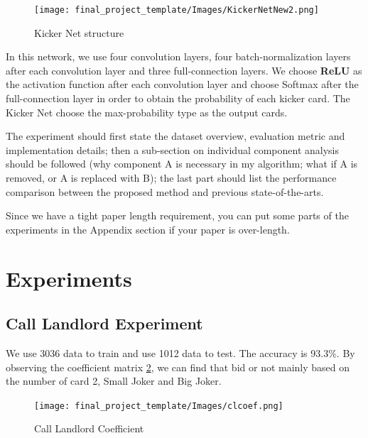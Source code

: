 \documentclass{article}
\begin{document}
\graphicspath{{Images/}}
\maketitle
\begin{figure}[htp]
    \caption{Kicker Net structure} \label{kicernetnew}
    \centering 
    \texttt{[image: final\_project\_template/Images/KickerNetNew2.png]}
\end{figure}

In this network, we use four convolution layers, four batch-normalization layers after each convolution layer and three full-connection layers. We choose \textbf{ReLU} as the activation function after each convolution layer and choose Softmax after the full-connection layer in order to obtain the probability of each kicker card. The Kicker Net choose the max-probability type as the output cards.



The experiment should first state the dataset overview, evaluation metric and implementation details; then a sub-section on individual component analysis should be followed (why component A is necessary in my algorithm; what if A is removed, or A is replaced with B); the last part should list the performance comparison between the proposed method and previous state-of-the-arts.

Since we have a tight paper length requirement, you can put some parts of the experiments in the Appendix section if your paper is over-length.

\section{Experiments}
\subsection{Call Landlord Experiment}
 We use 3036 data to train and use 1012 data to test. The accuracy is 93.3$\%$. By observing the coefficient matrix \ref{clcoef}, we can find that bid or not mainly based on the number of card 2, Small Joker and Big Joker.
 
\graphicspath{{Images/}}
\maketitle
\begin{figure}[htp]
    \caption{Call Landlord Coefficient} \label{clcoef}
    \centering 
    \texttt{[image: final\_project\_template/Images/clcoef.png]}
\end{figure}
\end{document}
